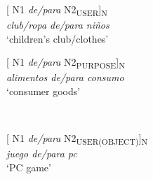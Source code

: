 \documentclass[output=paper]{langsci/langscibook}
\begin{document}
\begin{minipage}{0.4\textwidth}    %
[ N1 \textit{de/para} N2\textsubscript{USER}]\textsubscript{N}\\
\textit{club/ropa de/para niños }\\
`children’s club/clothes'
\end{minipage}
\hfill            %
\begin{minipage}{0.4\textwidth}
[ N1 \textit{de/para} N2\textsubscript{PURPOSE}]\textsubscript{N}\\
\textit{alimentos de/para consumo}\\
`consumer goods'
\end{minipage} \\
\hfill  
\vspace{0.5cm}

\begin{minipage}{0.4\textwidth}    %
[ N1 \textit{de/para} N2\textsubscript{USER(OBJECT)}]\textsubscript{N}\\
\textit{juego de/para pc}\\
`PC game'
\end{minipage}
\hfill  
\\
\end{document}

